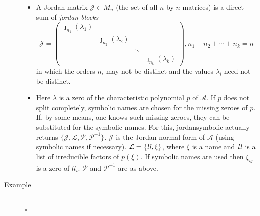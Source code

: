 \begin{description}
\begin{itemize}
\item A Jordan matrix $\mathcal{J} \in M_{n}$ (the set of all $n$ by $n$ 
      matrices) is a direct sum of \emph{jordan blocks}
%
      \begin{displaymath}
      \mathcal{J} = \begin{pmatrix} \jmath_{n_1}(\lambda_{1}) 
      \\  & \jmath_{n_2}(\lambda_{2}) \\ & & \ddots \\ & & & 
      \jmath_{n_k}(\lambda_{k}) \end{pmatrix} ,
      n_{1}+n_{2}+\cdots + n_{k} = n
      \end{displaymath}
%
      in which the orders $n_{i}$ may not be distinct and the 
      values ${\lambda_{i}}$ need not be distinct.

\item Here ${\lambda}$ is a zero of the characteristic polynomial 
      $p$ of $\mathcal{A}$. If $p$ does not split completely, 
      symbolic names are chosen for the missing zeroes of $p$.
      If, by some means, one knows such missing zeroes, they can be 
      substituted for the symbolic names. For this, 
      \f{jordansymbolic} actually returns $\{ \mathcal{J,L,P,P}^{-1} \}$.
      $\mathcal{J}$ is the Jordan normal form of $\mathcal{A}$ (using 
      symbolic names if necessary). $\mathcal{L} = \{ {\it ll}, \xi \}$, 
      where $\xi$ is a name and ${\it ll}$ is a list of irreducible 
      factors of $p(\xi)$. If symbolic names are used then 
      ${\xi}_{ij}$ is a zero of $ll_{i}$. $\mathcal{P}$ and 
      $\mathcal{P}^{-1}$ are as above.
\end{itemize}      

\item[Example]\mbox{}\\*


\end{description}
